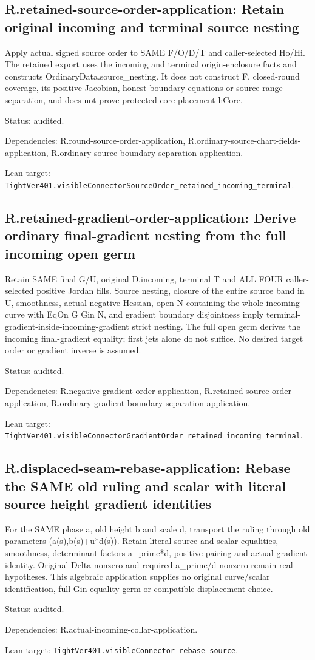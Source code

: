 \documentclass{article}
\begin{document}
\subsection*{R.retained-source-order-application: Retain original incoming and terminal source nesting}
Apply actual signed source order to SAME F/O/D/T and caller-selected Ho/Hi. The retained export uses the incoming and terminal origin-enclosure facts and constructs OrdinaryData.source\_nesting. It does not construct F, closed-round coverage, its positive Jacobian, honest boundary equations or source range separation, and does not prove protected core placement hCore.
\par Status: audited.
\par Dependencies: R.round-source-order-application, R.ordinary-source-chart-fields-application, R.ordinary-source-boundary-separation-application.
\par Lean target: \texttt{TightVer401.visibleConnectorSourceOrder\_retained\_incoming\_terminal}.
\subsection*{R.retained-gradient-order-application: Derive ordinary final-gradient nesting from the full incoming open germ}
Retain SAME final G/U, original D.incoming, terminal T and ALL FOUR caller-selected positive Jordan fills. Source nesting, closure of the entire source band in U, smoothness, actual negative Hessian, open N containing the whole incoming curve with EqOn G Gin N, and gradient boundary disjointness imply terminal-gradient-inside-incoming-gradient strict nesting. The full open germ derives the incoming final-gradient equality; first jets alone do not suffice. No desired target order or gradient inverse is assumed.
\par Status: audited.
\par Dependencies: R.negative-gradient-order-application, R.retained-source-order-application, R.ordinary-gradient-boundary-separation-application.
\par Lean target: \texttt{TightVer401.visibleConnectorGradientOrder\_retained\_incoming\_terminal}.
\subsection*{R.displaced-seam-rebase-application: Rebase the SAME old ruling and scalar with literal source height gradient identities}
For the SAME phase a, old height b and scale d, transport the ruling through old parameters (a(s),b(s)+u*d(s)). Retain literal source and scalar equalities, smoothness, determinant factors a\_prime*d, positive pairing and actual gradient identity. Original Delta nonzero and required a\_prime/d nonzero remain real hypotheses. This algebraic application supplies no original curve/scalar identification, full Gin equality germ or compatible displacement choice.
\par Status: audited.
\par Dependencies: R.actual-incoming-collar-application.
\par Lean target: \texttt{TightVer401.visibleConnector\_rebase\_source}.
\end{document}

